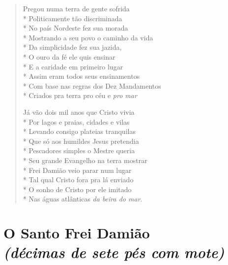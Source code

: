 \begin{verse}
Pregou numa terra de gente sofrida\\*
Politicamente tão discriminada\\*
No país Nordeste fez sua morada\\*
Mostrando a seu povo o caminho da vida\\*
Da simplicidade fez sua jazida,\\*
O ouro da fé ele quis ensinar\\*
E a caridade em primeiro lugar\\*
Assim eram todos seus ensinamentos\\*
Com base nas regras dos Dez Mandamentos\\*
Criados pra terra pro céu e \textit{pro mar}

Já vão dois mil anos que Cristo vivia\\*
Por lagos e praias, cidades e vilas\\*
Levando consigo plateias tranquilas\\*
Que só aos humildes Jesus pretendia\\*
Pescadores simples o Mestre queria\\*
Seu grande Evangelho na terra mostrar\\*
Frei Damião veio parar num lugar\\*
Tal qual Cristo fora pra lá enviado\\*
O sonho de Cristo por ele imitado\\*
Nas águas atlânticas \textit{da beira do mar}.
\end{verse}


\chapter[O Santo Frei Damião]{O Santo Frei Damião\\\smallskip\textit{(décimas de sete pés com mote)}}

